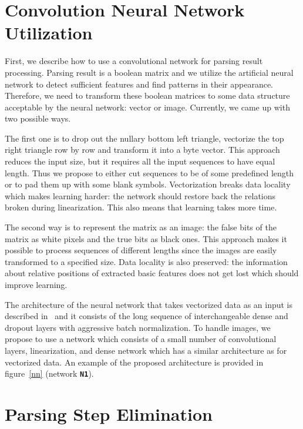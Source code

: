 \section{Convolution Neural Network Utilization}

First, we describe how to use a convolutional network for parsing result processing. Parsing result is a boolean matrix and we utilize the artificial neural network to detect sufficient features and find patterns in their appearance.
Therefore, we need to transform these boolean matrices to some data structure acceptable by the neural network: vector or image.
Currently, we came up with two possible ways.

The first one is to drop out the nullary bottom left triangle, vectorize the top right triangle row by row and transform it into a byte vector.
This approach reduces the input size, but it requires all the input sequences to have equal length.
Thus we propose to either cut sequences to be of some predefined length or to pad them up with some blank symbols.
Vectorization breaks data locality which makes learning harder: the network should restore back the relations broken during linearization.
This also means that learning takes more time.

The second way is to represent the matrix as an image: the false bits of the matrix as white pixels and the true bits as black ones.
This approach makes it possible to process sequences of different lengths since the images are easily transformed to a specified size.
Data locality is also preserved: the information about relative positions of extracted basic features does not get lost which should improve learning.

The architecture of the neural network that takes vectorized data as an input is described in~\cite{grigorevcomposition} and it consists of the long sequence of interchangeable dense and dropout layers with aggressive batch normalization. 
To handle images, we propose to use a network which consists of a small number of convolutional layers, linearization, and dense network which has a similar architecture as for vectorized data.
An example of the proposed architecture is provided in figure~\ref{nn} (network \textbf{\texttt{N1}}).

\section{Parsing Step Elimination}


